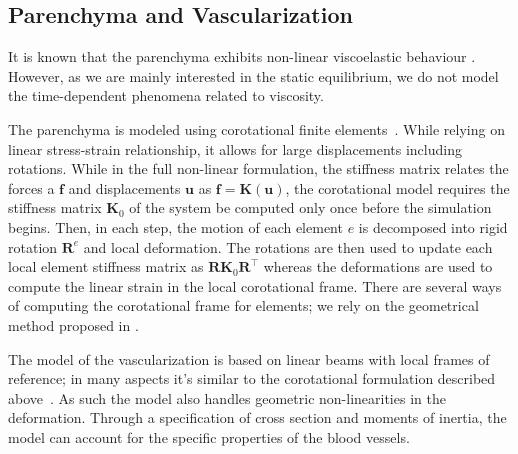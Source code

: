 \documentclass{llncs}
\renewcommand{\Vec}[1]{\mathbf{#1}}
\newcommand{\Mat}[1]{\mathbf{#1}}
\begin{document}
\subsection{Parenchyma and Vascularization} %

It is known that the parenchyma exhibits non-linear viscoelastic behaviour \cite{Marchesseau2010}.
However, as we are mainly interested in the static equilibrium, we do not model the time-dependent
phenomena related to viscosity.


The parenchyma is modeled using corotational finite elements~\cite{Felippa2005}.
While relying on linear stress-strain relationship, it allows for large displacements including rotations. 
While in the full non-linear formulation, the stiffness matrix relates the forces a $\Vec{f}$ and 
displacements $\Vec{u}$ as $\Vec{f} = \Mat{K}(\Vec{u})$, the corotational model 
requires the stiffness matrix $\Mat{K}_0$ of the system be computed only once before the simulation begins. 
Then, in each step, the motion of each element $e$ is decomposed into rigid rotation $\Mat{R}^e$ and local deformation. 
The rotations are then used to update each local element stiffness matrix as $\Mat{R}\Mat{K}_0\Mat{R}^{\top}$
whereas the deformations are used to compute the linear strain in the local corotational frame.
There are several ways of computing the corotational frame for elements; we rely on
the geometrical method proposed in \cite{Nesme2005}.

The model of the vascularization is based on linear beams 
with local frames of reference; in many aspects it's similar to the
corotational formulation described above~\cite{Duriez2006}. As such the model also handles geometric
non-linearities in the deformation. Through a specification of cross section and moments of inertia, 
the model can account for the specific properties of the blood vessels. 
\end{document}
